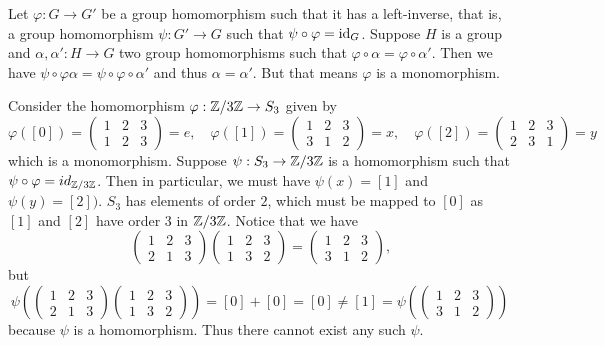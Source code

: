 \begin{problem}
\end{problem}

\begin{solution}
	Let $\varphi: G \to G'$ be a group homomorphism such that it has a left-inverse, that is, a group homomorphism $\psi: G' \to G$ such that $\psi \circ \varphi = \mathrm{id}_{G}$. Suppose $H$ is a group and $\alpha, \alpha': H \to G$ two group homomorphisms such that $\varphi \circ \alpha = \varphi \circ \alpha'$. Then we have $\psi \circ \varphi \alpha = \psi \circ \varphi \circ \alpha'$ and thus $\alpha = \alpha'$. But that means $\varphi$ is a monomorphism.
\end{solution}

\begin{problem}
\end{problem}

\begin{solution}
	Consider the homomorphism $\varphi: \mathbb{Z}/3\mathbb{Z} \to S_3$ given by
	\[
		\varphi([0]) = 
			\begin{pmatrix}
				1 & 2 & 3 \\
				1 & 2 & 3
			\end{pmatrix} = e,
		\quad
		\varphi([1]) =
			\begin{pmatrix}
				1 & 2 & 3 \\
				3 & 1 & 2
			\end{pmatrix} = x,
		\quad
		\varphi([2]) =
			\begin{pmatrix}
				1 & 2 & 3 \\
				2 & 3 & 1
			\end{pmatrix} = y
	\]
	which is a monomorphism. Suppose $\psi: S_3 \to \mathbb{Z}/3\mathbb{Z}$ is a homomorphism such that $\psi \circ \varphi = id_{\mathbb{Z}/3\mathbb{Z}}$. Then in particular, we must have $\psi(x) = [1]$ and $\psi(y) = [2])$. $S_3$ has elements of order $2$, which must be mapped to $[0]$ as $[1]$ and $[2]$ have order $3$ in $\mathbb{Z}/3\mathbb{Z}$. Notice that we have
	\[
		\begin{pmatrix}
			1 & 2 & 3 \\
			2 & 1 & 3
		\end{pmatrix}
		\begin{pmatrix}
			1 & 2 & 3 \\
			1 & 3 & 2
		\end{pmatrix} =
		\begin{pmatrix}
			1 & 2 & 3 \\
			3 & 1 & 2
		\end{pmatrix} \text{,}
	\]
	but
	\[
		\psi(
			\begin{pmatrix}
				1 & 2 & 3 \\
				2 & 1 & 3
			\end{pmatrix}
			\begin{pmatrix}
				1 & 2 & 3 \\
				1 & 3 & 2
			\end{pmatrix}
		) = [0] + [0] = [0] \neq [1] =
		\psi(
			\begin{pmatrix}
				1 & 2 & 3 \\
				3 & 1 & 2
			\end{pmatrix}
		)
	\]
	because $\psi$ is a homomorphism. Thus there cannot exist any such $\psi$.
\end{solution}

